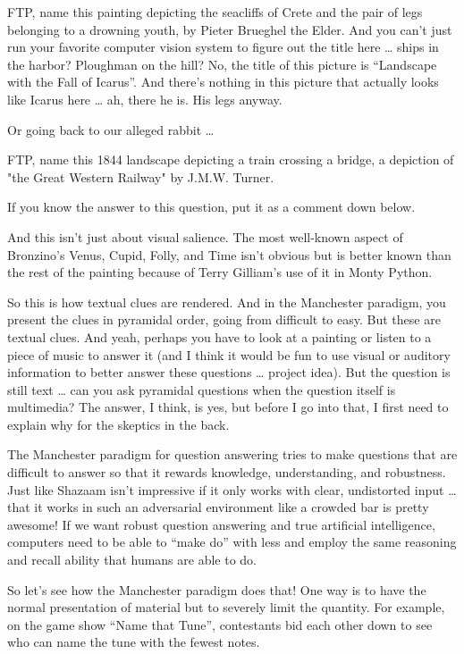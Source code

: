 FTP, name this painting depicting the seacliffs of Crete and the pair of legs belonging to a drowning youth, by Pieter Brueghel the Elder.  And you can’t just run your favorite computer vision system to figure out the title here … ships in the harbor? Ploughman on the hill?  No, the title of this picture is “Landscape with the Fall of Icarus”.  And there’s nothing in this picture that actually looks like Icarus here … ah, there he is.  His legs anyway. 

Or going back to our alleged rabbit … 

FTP, name this 1844 landscape depicting a train crossing a bridge, a depiction of "the Great Western Railway" by J.M.W. Turner.

If you know the answer to this question, put it as a comment down below.  

And this isn’t just about visual salience.  The most well-known aspect of Bronzino’s Venus, Cupid, Folly, and Time isn’t obvious but is better known than the rest of the painting because of Terry Gilliam’s use of it in Monty Python.

So this is how textual clues are rendered.  And in the Manchester paradigm, you present the clues in pyramidal order, going from difficult to easy.  But these are textual clues.  And yeah, perhaps you have to look at a painting or listen to a piece of music to answer it (and I think it would be fun to use visual or auditory information to better answer these questions … project idea).  But the question is still text … can you ask pyramidal questions when the question itself is multimedia?  The answer, I think, is yes, but before I go into that, I first need to explain why for the skeptics in the back.

The Manchester paradigm for question answering tries to make questions that are difficult to answer so that it rewards knowledge, understanding, and robustness.  Just like Shazaam isn’t impressive if it only works with clear, undistorted input … that it works in such an adversarial environment like a crowded bar is pretty awesome!  If we want robust question answering and true artificial intelligence, computers need to be able to “make do” with less and employ the same reasoning and recall ability that humans are able to do.

So let’s see how the Manchester paradigm does that!  One way is to have the normal presentation of material but to severely limit the quantity.  For example, on the game show “Name that Tune”, contestants bid each other down to see who can name the tune with the fewest notes.

